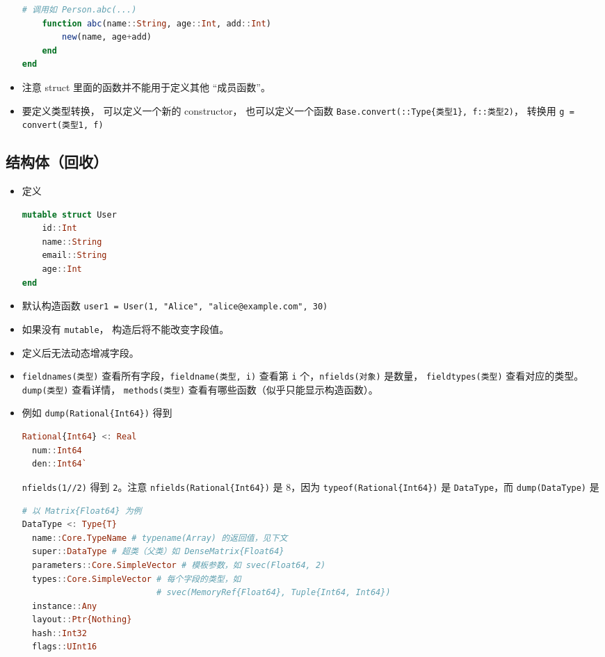 \begin{itemize}
\begin{lstlisting}[language=julia]
    # 调用如 Person.abc(...)
    function abc(name::String, age::Int, add::Int)
        new(name, age+add)
    end
end
\end{lstlisting}
\item 注意 struct 里面的函数并不能用于定义其他 “成员函数”。
\item 要定义类型转换， 可以定义一个新的 constructor， 也可以定义一个函数 \verb`Base.convert(::Type{类型1}, f::类型2)`， 转换用 \verb`g = convert(类型1, f)`
\end{itemize}

\subsection{结构体（回收）}
\begin{itemize}
\item 定义
\begin{lstlisting}[language=julia]
mutable struct User
    id::Int
    name::String
    email::String
    age::Int
end
\end{lstlisting}
\item 默认构造函数 \verb`user1 = User(1, "Alice", "alice@example.com", 30)`
\item 如果没有 \verb`mutable`， 构造后将不能改变字段值。
\item 定义后无法动态增减字段。
\item \verb`fieldnames(类型)` 查看所有字段，\verb`fieldname(类型, i)` 查看第 \verb`i` 个，\verb`nfields(对象)` 是数量， \verb`fieldtypes(类型)` 查看对应的类型。 \verb`dump(类型)` 查看详情， \verb`methods(类型)` 查看有哪些函数（似乎只能显示构造函数）。
\item 例如 \verb`dump(Rational{Int64})` 得到
\begin{lstlisting}[language=julia]
Rational{Int64} <: Real
  num::Int64
  den::Int64`
\end{lstlisting}
\verb`nfields(1//2)` 得到 \verb`2`。注意 \verb`nfields(Rational{Int64})` 是 8，因为 \verb`typeof(Rational{Int64})` 是 \verb`DataType`，而 \verb`dump(DataType)` 是
\begin{lstlisting}[language=julia]
# 以 Matrix{Float64} 为例
DataType <: Type{T}
  name::Core.TypeName # typename(Array) 的返回值，见下文
  super::DataType # 超类（父类）如 DenseMatrix{Float64}
  parameters::Core.SimpleVector # 模板参数，如 svec(Float64, 2)
  types::Core.SimpleVector # 每个字段的类型，如
                           # svec(MemoryRef{Float64}, Tuple{Int64, Int64})
  instance::Any
  layout::Ptr{Nothing}
  hash::Int32
  flags::UInt16
\end{lstlisting}

\end{itemize}
